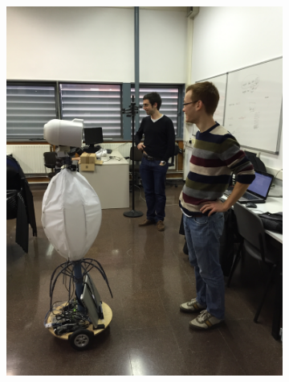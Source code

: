 \begin{figure}[htb!]
	\centering
	\begin{subfigure}[b]{0.3\textwidth}
		\includegraphics[width=\textwidth]{images/6_Confort_Area.jpg}
		\label{fig:comf1}
	\end{subfigure}
	~ %
	\begin{subfigure}[b]{0.3\textwidth}

\end{subfigure}
\end{figure}
